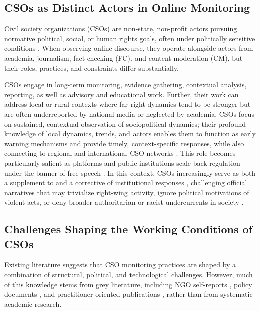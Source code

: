 \documentclass[acmsmall]{acmart}
\begin{document}
\subsection{CSOs as Distinct Actors in Online Monitoring}
\label{ssec:csos_distinct_actors}
Civil society organizations (CSOs) are non-state, non-profit actors pursuing normative political, social, or human rights goals, often under politically sensitive conditions \cite{osce_2018,capacity4dev_thematic_nodate}. 
When observing online discourse, they operate alongside actors from academia, journalism, fact-checking (FC), and content moderation (CM), but their roles, practices, and constraints differ substantially.

CSOs engage in long-term monitoring, evidence gathering, contextual analysis, reporting, as well as advisory and educational work. Further, their work can address local or rural contexts where far-right dynamics tend to be stronger \cite{diwBerlinGerman} but are often underreported by national media or neglected by academia. 
CSOs focus on sustained, contextual observation of sociopolitical dynamics; their profound knowledge of local dynamics, trends, and actors enables them to function as early warning mechanisms and provide timely, context-specific responses, while also connecting to regional and international CSO networks \cite{osce_2018,ihler_monitoring_2025}. 
This role becomes particularly salient as platforms and public institutions scale back regulation under the banner of free speech \cite{benavidez_big_2023, kayyali_metas_2025}. In this context, CSOs increasingly serve as both a supplement to and a corrective of institutional responses \cite{smidt_civil_2025}, challenging official narratives that may trivialize right-wing activity, ignore political motivations of violent acts, or deny broader authoritarian or racist undercurrents in society \cite{Bernhard2019,ihler_monitoring_2025}. 


\subsection{Challenges Shaping the Working Conditions of CSOs}
\label{ssec:challenges}

Existing literature suggests that CSO monitoring practices are shaped by a combination of structural, political, and technological challenges. However, much of this knowledge stems from grey literature, including NGO self-reports \cite{hulshof-schmidt_2024_2024,noauthor_state_2025}, policy documents \cite{FRA2018,noauthor_protecting_2023}, and practitioner-oriented publications \cite{ihler_monitoring_2025}, rather than from systematic academic research. 
\end{document}

